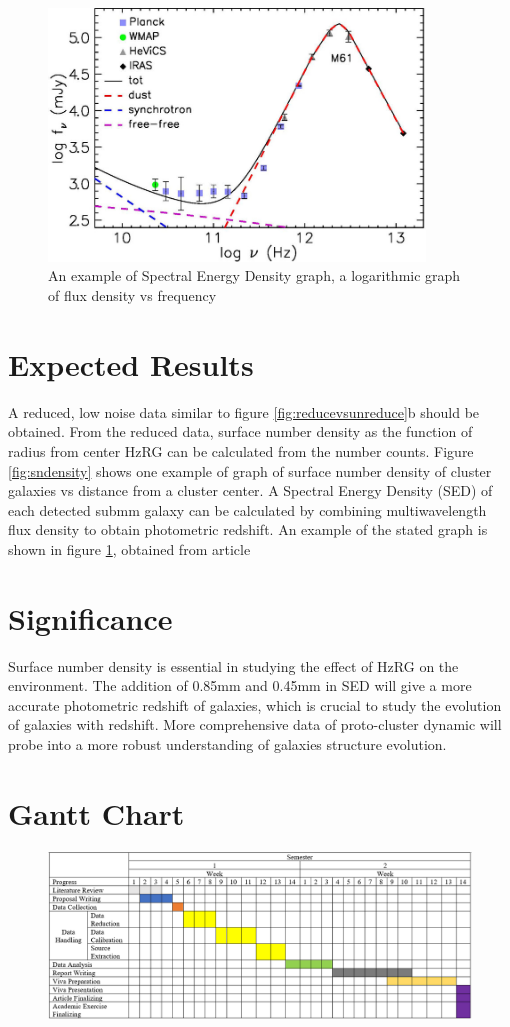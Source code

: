 \documentclass{article}
\begin{document}
\begin{figure}
    \centering
    \includegraphics[width=100mm]{SED.png}
    \caption{An example of Spectral Energy Density graph, a logarithmic graph of flux density vs frequency}
    \label{fig:sedgraph}
\end{figure}

\section{Expected Results}
A reduced, low noise data similar to figure \ref{fig:reducevsunreduce}b should be obtained. From the reduced data, surface number density as the function of radius from center HzRG can be calculated from the number counts. Figure \ref{fig:sndensity} shows one example of graph of surface number density of cluster galaxies vs distance from a cluster center. A Spectral Energy Density (SED) of each detected submm galaxy can be calculated by combining multiwavelength flux density to obtain photometric redshift. An example of the stated graph is shown in figure \ref{fig:sedgraph}, obtained from article \parencite{Zotti2018}

\section{Significance}
Surface number density is essential in studying the effect of HzRG on the environment. The addition of 0.85mm and 0.45mm in SED will give a more accurate photometric redshift of galaxies, which is crucial to study the evolution of galaxies with redshift. More comprehensive data of proto-cluster dynamic will probe into a more robust understanding of galaxies structure evolution.

\section{Gantt Chart}
\begin{figure}[h]
    \centering
    \includegraphics[width=150mm]{gantt chart.png}
    \caption{}
    \label{fig:ganttchart}
\end{figure}

\printbibliography
\end{document}
